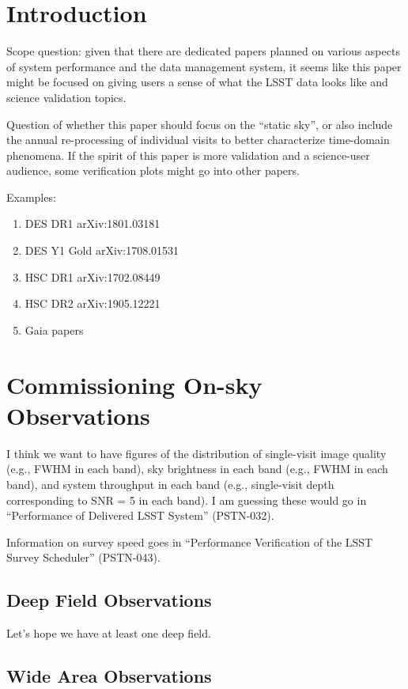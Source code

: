 \section{Introduction}

Scope question: given that there are dedicated papers planned on various aspects of system performance and the data management system, it seems like this paper might be focused on giving users a sense of what the LSST data looks like and science validation topics. 

Question of whether this paper should focus on the ``static sky'', or also include the annual re-processing of individual visits to better characterize time-domain phenomena.
If the spirit of this paper is more validation and a science-user audience, some verification plots might go into other papers.

Examples:

\begin{enumerate}
\item DES DR1 arXiv:1801.03181
\item DES Y1 Gold arXiv:1708.01531
\item HSC DR1 arXiv:1702.08449
\item HSC DR2 arXiv:1905.12221
\item Gaia papers
\end{enumerate}

\section{Commissioning On-sky Observations}

I think we want to have figures of the distribution of single-visit image quality (e.g., FWHM in each band), sky brightness in each band (e.g., FWHM in each band), and system throughput in each band (e.g., single-visit depth corresponding to SNR = 5 in each band). I am guessing these would go in ``Performance of Delivered LSST System'' (PSTN-032).

Information on survey speed goes in ``Performance Verification of the LSST Survey Scheduler'' (PSTN-043).

\subsection{Deep Field Observations}

Let's hope we have at least one deep field.

\subsection{Wide Area Observations}

